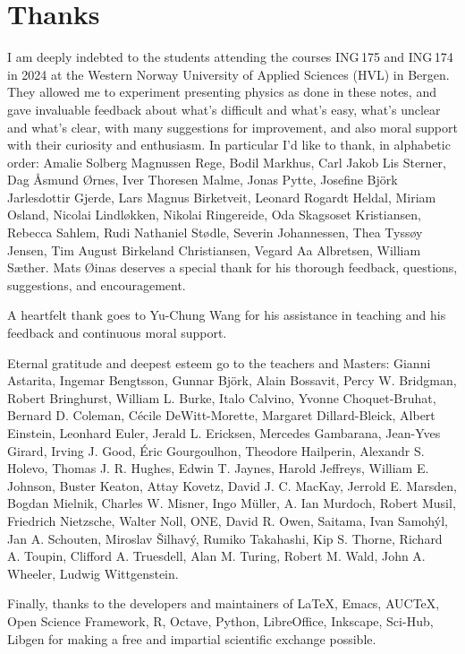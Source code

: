 \documentclass[a4paper,12pt,%
onecolumn,oneside,%
british%
]{memoir}
\newcommand{\addsec}[1]{\section*{#1}\addcontentsline{toc}{section}{#1}}
\renewcommand*{\|}[1][]{\nonscript\:#1\vert\nonscript\:\mathopen{}}
\begin{document}
\iftrue
\addsec{Thanks}
\label{sec:thanks}

I am deeply indebted to the students attending the courses ING\,175 and ING\,174 in 2024 at the Western Norway University of Applied Sciences (HVL) in Bergen. They allowed me to experiment presenting physics as done in these notes, and gave invaluable feedback about what's difficult and what's easy, what's unclear and what's clear, with many suggestions for improvement, and also moral support with their curiosity and enthusiasm. In particular I'd like to thank, in alphabetic order: %
Amalie Solberg Magnussen Rege, %
Bodil Markhus, %
Carl Jakob Lis Sterner, %
Dag Åsmund Ørnes, %
Iver Thoresen Malme, %
Jonas Pytte, %
Josefine Björk Jarlesdottir Gjerde, %
Lars Magnus Birketveit, %
Leonard Rogardt Heldal, %
Miriam Osland, %
Nicolai Lindløkken, %
Nikolai Ringereide, %
Oda Skagsoset Kristiansen, %
Rebecca Sahlem, %
Rudi Nathaniel Stødle, %
Severin Johannessen, %
Thea Tyssøy Jensen, %
Tim August Birkeland Christiansen, %
Vegard Aa Albretsen, %
William Sæther. %
Mats Øinas deserves a special thank for his thorough feedback, questions, suggestions, and encouragement.

A heartfelt thank goes to Yu-Chung Wang for his assistance in teaching and his feedback and continuous moral support.

Eternal gratitude and deepest esteem go to the teachers and Masters:
Gianni Astarita,
Ingemar Bengtsson,
Gunnar Bj\"ork,
Alain Bossavit,
Percy W. Bridgman,
Robert Bringhurst,
William L. Burke,
Italo Calvino,
Yvonne Choquet-Bruhat,
Bernard D. Coleman,
C\'ecile DeWitt-Morette,
Margaret Dillard-Bleick,
Albert Einstein,
Leonhard Euler,
Jerald L. Ericksen,
Mercedes Gambarana,
Jean-Yves Girard,
Irving J. Good,
\'Eric Gourgoulhon,
Theodore Hailperin,
Alexandr S. Holevo,
Thomas J. R. Hughes,
Edwin T. Jaynes,
Harold Jeffreys,
William E. Johnson,
Buster Keaton,
Attay Kovetz,
David J. C. MacKay,
Jerrold E. Marsden,
Bogdan Mielnik,
Charles W. Misner,
Ingo M\"uller,
A. Ian Murdoch,
Robert Musil,
Friedrich Nietzsche,
Walter Noll,
ONE,
David R. Owen,
Saitama,
Ivan Samoh\'yl,
Jan A. Schouten,
Miroslav \v{S}ilhav\'y,
Rumiko Takahashi,
Kip S. Thorne,
Richard A. Toupin,
Clifford A. Truesdell,
Alan M. Turing,
Robert M. Wald,
John A. Wheeler,
Ludwig Wittgenstein.

Finally, thanks to the developers and maintainers of \LaTeX, Emacs, AUC\TeX, Open Science Framework, R, Octave, Python, LibreOffice, Inkscape, Sci-Hub, Libgen for making a free and impartial scientific exchange possible.
\fi
\end{document}
